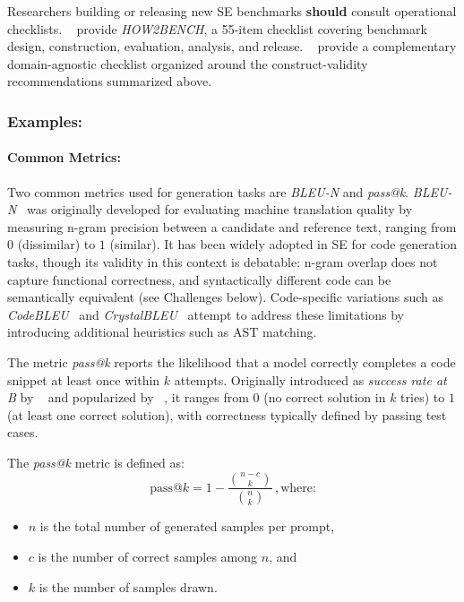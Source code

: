 \documentclass[smallextended]{svjour3}
\newcommand{\should}{\textbf{should}\xspace}
\newcommand{\guidelinesubsubsection}[1]{\subsubsection{\bfseries #1:}}
\newcommand{\guidelinesubsubsection}[1]{\subsubsection{#1}}
\begin{document}
Researchers building or releasing new SE benchmarks \should consult operational checklists. \citeauthor{cao2025should}~\cite{cao2025should} provide \emph{HOW2BENCH}, a 55-item checklist covering benchmark design, construction, evaluation, analysis, and release. \citeauthor{bean2025measuring}~\cite{bean2025measuring} provide a complementary domain-agnostic checklist organized around the construct-validity recommendations summarized above.

\guidelinesubsubsection{Examples}

\paragraph{Common Metrics:}

Two common metrics used for generation tasks are \emph{BLEU-N} and \emph{pass@k}.
\emph{BLEU-N}~\cite{DBLP:conf/acl/PapineniRWZ02} was originally developed for evaluating machine translation quality by measuring n-gram precision between a candidate and reference text, ranging from $0$ (dissimilar) to $1$ (similar). It has been widely adopted in SE for code generation tasks, though its validity in this context is debatable: n-gram overlap does not capture functional correctness, and syntactically different code can be semantically equivalent (see Challenges below).
Code-specific variations such as \emph{CodeBLEU}~\cite{DBLP:journals/corr/abs-2009-10297} and \emph{CrystalBLEU}~\cite{DBLP:conf/kbse/EghbaliP22} attempt to address these limitations by introducing additional heuristics such as AST matching.

The metric \emph{pass@k} reports the likelihood that a model correctly completes a code snippet at least once within $k$ attempts. Originally introduced as \emph{success rate at B} by \citeauthor{DBLP:conf/nips/KulalPC0PAL19}~\cite{DBLP:conf/nips/KulalPC0PAL19} and popularized by \citeauthor{DBLP:journals/corr/abs-2107-03374}~\cite{DBLP:journals/corr/abs-2107-03374}, it ranges from $0$ (no correct solution in $k$ tries) to $1$ (at least one correct solution), with correctness typically defined by passing test cases.

The \emph{pass@k} metric is defined as:
\[
\text{pass@}k = 1 - \frac{\binom{n-c}{k}}{\binom{n}{k}}\,, \text{where:}
\]
\begin{itemize}
  \item $n$ is the total number of generated samples per prompt,
  \item $c$ is the number of correct samples among $n$, and
  \item $k$ is the number of samples drawn.
\end{itemize}
\end{document}
